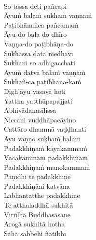 \begin{pali-hang}
\\
So tassa deti pañcapi\\
Āyuṁ balaṁ sukhaṁ vaṇṇaṁ\\
Paṭibhānañca pañcamaṁ\hyperlink{endnote1-appendix}{\hypertarget{endnote1-body}{}}\\
Āyu-do bala-do dhīro\\
Vaṇṇa-do paṭibhāṇa-do\\
Sukhassa dātā medhāvī\\
Sukhaṁ so adhigacchati\\
Āyuṁ datvā balaṁ vaṇṇaṁ\\
Sukhañ-ca paṭibhāna-kaṁ\hyperlink{endnote1-appendix}{\hypertarget{endnote1-body}{}}\\
Dīgh'āyu yasavā hoti\\
Yattha yatthūpapajjati\\
Abhivādanasīlissa\\
Niccaṁ vuḍḍhāpacāyino\\
Cattāro dhammā vaḍḍhanti\\
Āyu vaṇṇo sukhaṁ balaṁ\\
Padakkhiṇaṁ kāyakammaṁ\\
Vācākammaṁ padakkhiṇaṁ\\
Padakkhiṇaṁ manokammaṁ\\
Paṇīdhi te padakkhiṇe\\
Padakkhiṇāni katvāna\\
Labhantatthe padakkhiṇe\\
Te atthaladdhā sukhitā\\
Virūḷhā Buddhasāsane\\
Arogā sukhitā hotha\\
Saha sabbehi ñātibhī
\end{pali-hang}

